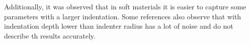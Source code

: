 

 Additionally, it was observed that in soft materials it is easier to capture 
 some parameters with a larger indentation. Some references also observe that with
 indentation depth lower than indenter radius has a lot of noise and do not describe
 th results accurately. %

%            

